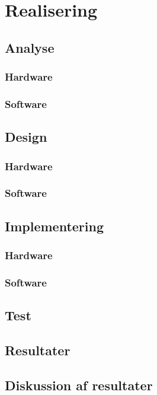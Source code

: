 \documentclass[a4paper, 11pt, oneside]{AuProjectHandin}
\begin{document}

\frontmatter
\tableofcontents
\mainmatter





\chapter{Realisering}

\section{Analyse}
\subsection{Hardware}

\subsection{Software}




\section{Design}
\subsection{Hardware}

\subsection{Software}



\section{Implementering}
\subsection{Hardware}
\subsection{Software}



\section{Test}


\section{Resultater}

\section{Diskussion af resultater}


\backmatter

\end{document}
